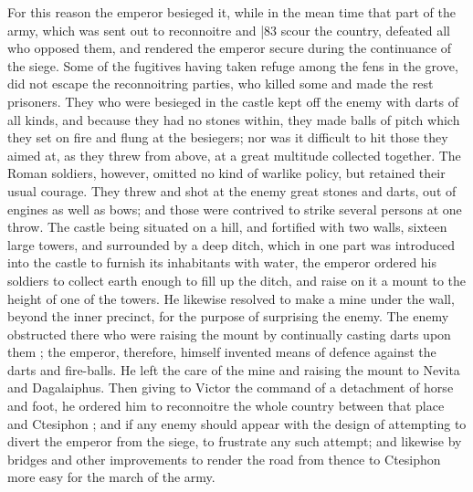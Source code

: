 For this reason the emperor besieged it, while in the mean time that part of the army, which was sent out to reconnoitre and
|83 scour the country, defeated all who opposed them, and rendered the emperor secure during the continuance of the siege. Some of the fugitives having taken refuge among the fens in the grove, did not escape the reconnoitring parties, who killed some and made the rest prisoners. They who were besieged in the castle kept off the enemy with darts of all kinds, and because they had no stones within, they made balls of pitch which they set on fire and flung at the besiegers; nor was it difficult to hit those they aimed at, as they threw from above, at a great multitude collected together. The Roman soldiers, however, omitted no kind of warlike policy, but retained their usual courage. They threw and shot at the enemy great stones and darts, out of engines as well as bows; and those were contrived to strike several persons at one throw. The castle being situated on a hill, and fortified with two walls, sixteen large towers, and surrounded by a deep ditch, which in one part was introduced into the castle to furnish its inhabitants with water, the emperor ordered his soldiers to collect earth enough to fill up the ditch, and raise on it a mount to the height of one of the towers. He likewise resolved to make a mine under the wall, beyond the inner precinct, for the purpose of surprising the enemy. The enemy obstructed there who were raising the mount by continually casting darts upon them ; the emperor, therefore, himself invented means of defence against the darts and fire-balls. He left the care of the mine and raising the mount to Nevita and Dagalaiphus. Then giving to Victor the command of a detachment of horse and foot, he ordered him to reconnoitre the whole country between that place and Ctesiphon ; and if any enemy should appear with the design of attempting to divert the emperor from the siege, to frustrate any such attempt; and likewise by bridges and other improvements to render the road from thence to Ctesiphon more easy for the march of the army.


